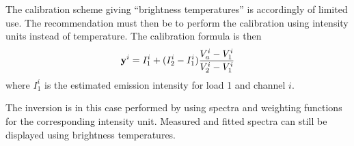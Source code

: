  The calibration scheme giving ``brightness temperatures'' is
 accordingly of limited use. The recommendation must then be to 
 perform the calibration using intensity units instead of temperature.
 The calibration formula is then
 \begin{equation}
   \mathbf{y}^i = I_1^i + (I_2^i-I_1^i)\frac{V_a^i-V_1^i}{V_2^i-V_1^i}
   \label{eq:sensor:cal:loadswitch}
 \end{equation}
 where $I_1^i$ is the estimated emission intensity for load 1 and
 channel $i$. 
 
 The inversion is in this case performed by using spectra and
 weighting functions for the corresponding intensity unit. 
 Measured and fitted spectra can still be displayed using brightness
 temperatures. 

 
 
 



